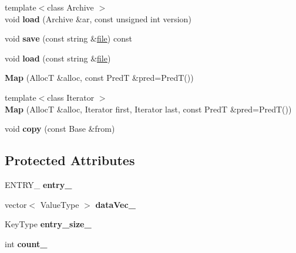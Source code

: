 \begin{CompactItemize}
\item 
\hypertarget{classMap_3f57005e15bc10aaf61d42097c950d91}{
{\footnotesize template$<$class Archive $>$ }\\void \textbf{load} (Archive \&ar, const unsigned int version)}
\label{classMap_3f57005e15bc10aaf61d42097c950d91}

\item 
\hypertarget{classMap_9093e5050c37e510c44ad9c8560617ad}{
void \textbf{save} (const string \&\hyperlink{classfile}{file}) const }
\label{classMap_9093e5050c37e510c44ad9c8560617ad}

\item 
\hypertarget{classMap_23c4353d14b9796736666a9d32957bf2}{
void \textbf{load} (const string \&\hyperlink{classfile}{file})}
\label{classMap_23c4353d14b9796736666a9d32957bf2}

\item 
\hypertarget{classMap_34dd2506319208393f742aabf3992ffa}{
\textbf{Map} (AllocT \&alloc, const PredT \&pred=PredT())}
\label{classMap_34dd2506319208393f742aabf3992ffa}

\item 
\hypertarget{classMap_2d90c2c5ac5feee45082e6074c90b30f}{
{\footnotesize template$<$class Iterator $>$ }\\\textbf{Map} (AllocT \&alloc, Iterator first, Iterator last, const PredT \&pred=PredT())}
\label{classMap_2d90c2c5ac5feee45082e6074c90b30f}

\item 
\hypertarget{classMap_bb40e87b15d9ce9c75cb56d83d4635f5}{
void \textbf{copy} (const Base \&from)}
\label{classMap_bb40e87b15d9ce9c75cb56d83d4635f5}

\end{CompactItemize}
\subsection*{Protected Attributes}
\begin{CompactItemize}
\item 
\hypertarget{classMap_aef62b0c834655cb9e086bea2c6f1285}{
ENTRY\_\- \textbf{entry\_\-}}
\label{classMap_aef62b0c834655cb9e086bea2c6f1285}

\item 
\hypertarget{classMap_976274497aa599402a61d4f4d062ca77}{
vector$<$ ValueType $>$ \textbf{dataVec\_\-}}
\label{classMap_976274497aa599402a61d4f4d062ca77}

\item 
\hypertarget{classMap_3bfdca718cd015a3e8ad1970e8e81cde}{
KeyType \textbf{entry\_\-size\_\-}}
\label{classMap_3bfdca718cd015a3e8ad1970e8e81cde}

\item 
\hypertarget{classMap_678a5c672b55c44e84db946081e70664}{
int \textbf{count\_\-}}
\label{classMap_678a5c672b55c44e84db946081e70664}

\end{CompactItemize}
